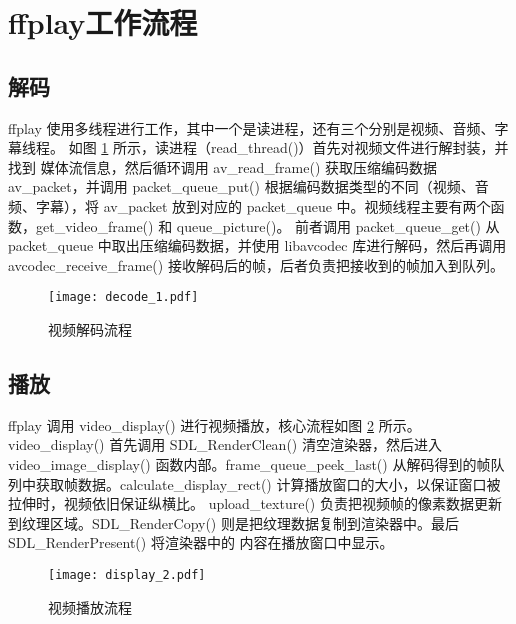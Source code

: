 
\section{ffplay工作流程}

\subsection{解码}

ffplay 使用多线程进行工作，其中一个是读进程，还有三个分别是视频、音频、字幕线程。
如图 \ref{fig:decode} 所示，读进程（read\_thread()）首先对视频文件进行解封装，并找到
媒体流信息，然后循环调用 av\_read\_frame() 
获取压缩编码数据 av\_packet，并调用 packet\_queue\_put() 根据编码数据类型的不同（视频、音频、字幕），将 av\_packet 放到对应的 packet\_queue 
中。视频线程主要有两个函数，get\_video\_frame() 和 queue\_picture()。
前者调用 packet\_queue\_get() 从 packet\_queue 中取出压缩编码数据，并使用 libavcodec 库进行解码，然后再调用 avcodec\_receive\_frame()
接收解码后的帧，后者负责把接收到的帧加入到队列。

\begin{figure}[h]
\centering
\texttt{[image: decode\_1.pdf]}
\caption{视频解码流程}
\label{fig:decode}
\end{figure}

\subsection{播放}

ffplay 调用 video\_display() 进行视频播放，核心流程如图 \ref{fig:display} 所示。video\_display() 首先调用 SDL\_RenderClean() 清空渲染器，然后进入 video\_image\_display()
函数内部。frame\_queue\_peek\_last() 从解码得到的帧队列中获取帧数据。calculate\_display\_rect() 计算播放窗口的大小，以保证窗口被拉伸时，视频依旧保证纵横比。
upload\_texture() 负责把视频帧的像素数据更新到纹理区域。SDL\_RenderCopy() 则是把纹理数据复制到渲染器中。最后 SDL\_RenderPresent() 将渲染器中的
内容在播放窗口中显示。

\begin{figure}[h]
\centering
\texttt{[image: display\_2.pdf]}
\caption{视频播放流程}
\label{fig:display}
\end{figure}

